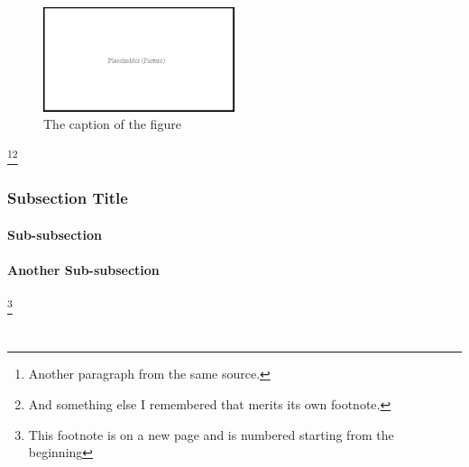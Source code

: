 \documentclass[12pt, oneside]{report}
\begin{document}
\begin{figure}[h]
  \centering
  \includegraphics[width=0.5\textwidth]{figures/pictures/placeholder}
  \caption{The caption of the figure}
  \label{fig:BlockDiagram4}
\end{figure}



\lipsum[4]%
\footnote{Another paragraph from the same source.}\footnote{And something else I remembered that merits its own footnote.}

\subsection{Subsection Title}
\lipsum[5]

\subsubsection{Sub-subsection}
\lipsum[6-7]
\subsubsection{Another Sub-subsection}
\lipsum[8-9]\footnote{This footnote is on a new page and is numbered starting from the beginning}

\section{\lipsum[150][4]}

\subsection{\lipsum[150][8]}
\lipsum[10]

\unpacklipsum[150][5]
\chapter{\lipsumexp}

\section{\lipsum[150][6]}
\lipsum[5-6]
\end{document}
